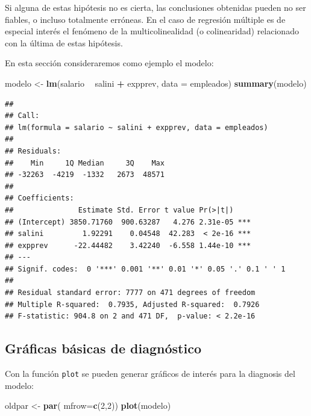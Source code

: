 \documentclass[]{book}
\newenvironment{Shaded}{\begin{snugshade}}{\end{snugshade}}
\newcommand{\DataTypeTok}[1]{\textcolor[rgb]{0.13,0.29,0.53}{#1}}
\newcommand{\DecValTok}[1]{\textcolor[rgb]{0.00,0.00,0.81}{#1}}
\newcommand{\KeywordTok}[1]{\textcolor[rgb]{0.13,0.29,0.53}{\textbf{#1}}}
\newcommand{\NormalTok}[1]{#1}
\newcommand{\OperatorTok}[1]{\textcolor[rgb]{0.81,0.36,0.00}{\textbf{#1}}}
\newcommand{\StringTok}[1]{\textcolor[rgb]{0.31,0.60,0.02}{#1}}
\begin{document}
Si alguna de estas hipótesis no es cierta, las conclusiones obtenidas pueden no ser
fiables, o incluso totalmente erróneas. En el caso de regresión múltiple es
de especial interés el fenómeno de la multicolinealidad (o colinearidad)
relacionado con la última de estas hipótesis.

En esta sección consideraremos como ejemplo el modelo:

\begin{Shaded}
\begin{Highlighting}[]
\NormalTok{modelo <-}\StringTok{ }\KeywordTok{lm}\NormalTok{(salario }\OperatorTok{~}\StringTok{ }\NormalTok{salini }\OperatorTok{+}\StringTok{ }\NormalTok{expprev, }\DataTypeTok{data =}\NormalTok{ empleados)}
\KeywordTok{summary}\NormalTok{(modelo)   }
\end{Highlighting}
\end{Shaded}

\begin{verbatim}
## 
## Call:
## lm(formula = salario ~ salini + expprev, data = empleados)
## 
## Residuals:
##    Min     1Q Median     3Q    Max 
## -32263  -4219  -1332   2673  48571 
## 
## Coefficients:
##               Estimate Std. Error t value Pr(>|t|)    
## (Intercept) 3850.71760  900.63287   4.276 2.31e-05 ***
## salini         1.92291    0.04548  42.283  < 2e-16 ***
## expprev      -22.44482    3.42240  -6.558 1.44e-10 ***
## ---
## Signif. codes:  0 '***' 0.001 '**' 0.01 '*' 0.05 '.' 0.1 ' ' 1
## 
## Residual standard error: 7777 on 471 degrees of freedom
## Multiple R-squared:  0.7935, Adjusted R-squared:  0.7926 
## F-statistic: 904.8 on 2 and 471 DF,  p-value: < 2.2e-16
\end{verbatim}

\hypertarget{graficas-basicas-de-diagnostico}{%
\subsection{Gráficas básicas de diagnóstico}\label{graficas-basicas-de-diagnostico}}

Con la función \texttt{plot} se pueden generar gráficos de interés para la diagnosis del modelo:

\begin{Shaded}
\begin{Highlighting}[]
\NormalTok{oldpar <-}\StringTok{ }\KeywordTok{par}\NormalTok{( }\DataTypeTok{mfrow=}\KeywordTok{c}\NormalTok{(}\DecValTok{2}\NormalTok{,}\DecValTok{2}\NormalTok{))}
\KeywordTok{plot}\NormalTok{(modelo)}
\end{Highlighting}
\end{Shaded}
\end{document}
